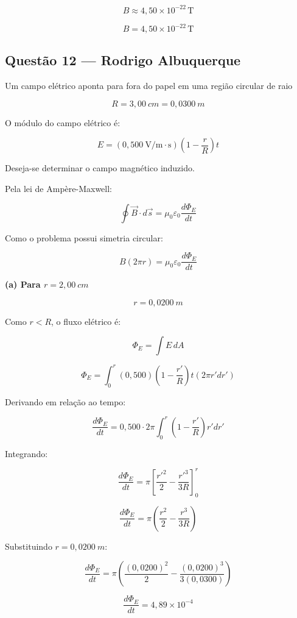 \documentclass[12pt,a4paper]{article}
\begin{document}
\[
B \approx 4,50 \times 10^{-22}\,\text{T}
\]

\[
\boxed{B = 4,50 \times 10^{-22}\,\text{T}}
\]

\subsection{Questão 12 — Rodrigo Albuquerque}

Um campo elétrico aponta para fora do papel em uma região circular de raio

\[
R=3,00\ cm=0,0300\ m
\]

O módulo do campo elétrico é:

\[
E=(0,500\ \text{V/m}\cdot\text{s})\left(1-\frac{r}{R}\right)t
\]

Deseja-se determinar o campo magnético induzido.

\vspace{0.5cm}

Pela lei de Ampère-Maxwell:

\[
\oint \vec B\cdot d\vec s
=
\mu_0\varepsilon_0
\frac{d\Phi_E}{dt}
\]

Como o problema possui simetria circular:

\[
B(2\pi r)
=
\mu_0\varepsilon_0
\frac{d\Phi_E}{dt}
\]

\vspace{0.5cm}

\textbf{(a) Para \(r=2,00\ cm\)}

\[
r=0,0200\ m
\]

Como \(r<R\), o fluxo elétrico é:

\[
\Phi_E
=
\int E\,dA
\]

\[
\Phi_E
=
\int_0^r
(0,500)\left(1-\frac{r'}{R}\right)t
(2\pi r' dr')
\]

Derivando em relação ao tempo:

\[
\frac{d\Phi_E}{dt}
=
0,500\cdot2\pi
\int_0^r
\left(1-\frac{r'}{R}\right)r' dr'
\]

Integrando:

\[
\frac{d\Phi_E}{dt}
=
\pi
\left[
\frac{r'^2}{2}
-
\frac{r'^3}{3R}
\right]_0^r
\]

\[
\frac{d\Phi_E}{dt}
=
\pi
\left(
\frac{r^2}{2}
-
\frac{r^3}{3R}
\right)
\]

Substituindo \(r=0,0200\ m\):

\[
\frac{d\Phi_E}{dt}
=
\pi
\left(
\frac{(0,0200)^2}{2}
-
\frac{(0,0200)^3}{3(0,0300)}
\right)
\]

\[
\frac{d\Phi_E}{dt}
=
4,89\times10^{-4}
\]
\end{document}
